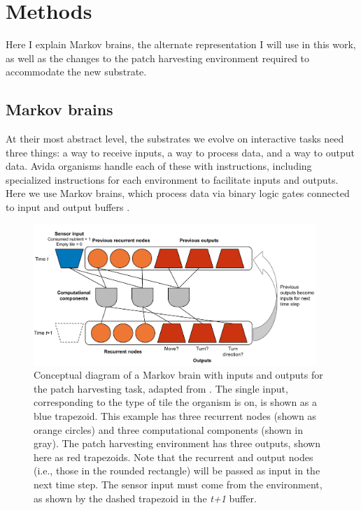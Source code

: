 \section{Methods}
Here I explain Markov brains, the alternate representation I will use in this work, as well as the changes to the patch harvesting environment required to accommodate the new substrate. 

\subsection{Markov brains}

At their most abstract level, the substrates we evolve on interactive tasks need three things: a way to receive inputs, a way to process data, and a way to output data. 
Avida organisms handle each of these with instructions, including specialized instructions for each environment to facilitate inputs and outputs. %
Here we use Markov brains, which process data via binary logic gates connected to input and output buffers \citep{hintzeMarkovBrainsTechnical2017}. 


\begin{figure}[h!]
    \centering
    \includegraphics[width=0.95\textwidth]{07_potentiation_across_representations/media/markov_brain_conceptual_figure.pdf}
    \caption{Conceptual diagram of a Markov brain with inputs and outputs for the patch harvesting task, adapted from \citep{hintzeMarkovBrainsTechnical2017}.
    The single input, corresponding to the type of tile the organism is on, is shown as a blue trapezoid. 
    This example has three recurrent nodes (shown as orange circles) and three computational components (shown in gray). 
    The patch harvesting environment has three outputs, shown here as red trapezoids. 
    Note that the recurrent and output nodes (i.e., those in the rounded rectangle) will be passed as input in the next time step.
    The sensor input must come from the environment, as shown by the dashed trapezoid in the \textit{t+1} buffer.}
    \label{fig:varying_representations:markov_brain}
\end{figure}


